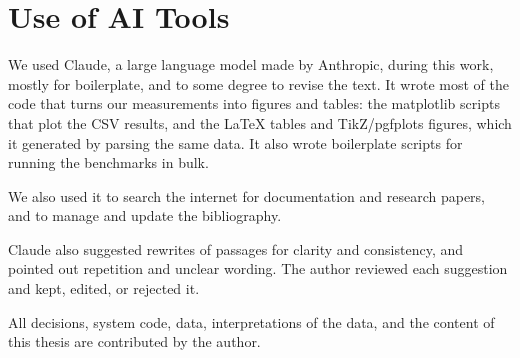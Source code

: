 \documentclass[12pt]{report}
\renewcommand{\_}{\origunderscore\allowbreak}
\begin{document}
\clearpage
\chapter*{Use of AI Tools}

We used Claude, a large language model made by Anthropic, during this work, mostly for boilerplate, and to some degree to revise the text. It wrote most of the code that turns our measurements into figures and tables: the matplotlib scripts that plot the CSV results, and the \LaTeX{} tables and TikZ/pgfplots figures, which it generated by parsing the same data. It also wrote boilerplate scripts for running the benchmarks in bulk.

We also used it to search the internet for documentation and research papers, and to manage and update the bibliography.

Claude also suggested rewrites of passages for clarity and consistency, and pointed out repetition and unclear wording. The author reviewed each suggestion and kept, edited, or rejected it.

All decisions, system code, data, interpretations of the data, and the content of this thesis are contributed by the author.

\printbibliography
\end{document}
